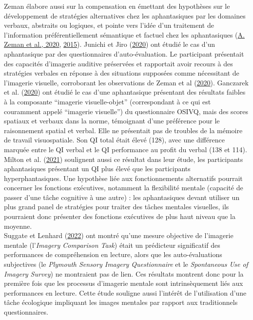 \documentclass[
  12pt,
]{article}
\begin{document}
Zeman élabore aussi sur la compensation en émettant des hypothèses sur
le développement de stratégies alternatives chez les aphantasiques par
les domaines verbaux, abstraits ou logiques, et pointe vers l'idée d'un
traitement de l'information préférentiellement sémantique et factuel
chez les aphantasiques
(\protect\hyperlink{ref-zemanPhantasiaPsychologicalSignificance2020}{A.
Zeman et al., 2020},
\protect\hyperlink{ref-zemanLivesImageryCongenital2015}{2015}). Junichi
et Jiro
(\protect\hyperlink{ref-junichiPreliminarySinglecaseStudy2020}{2020})
ont étudié le cas d'un aphantasique par des questionnaires
d'auto-évaluation. Le participant présentait des capacités d'imagerie
auditive préservées et rapportait avoir recours à des stratégies
verbales en réponse à des situations supposées comme nécessitant de
l'imagerie visuelle, corroborant les observations de Zeman et al
(\protect\hyperlink{ref-zemanPhantasiaPsychologicalSignificance2020}{2020}).
Ganczarek et al.
(\protect\hyperlink{ref-ganczarekRememberThingsCan2020}{2020}) ont
étudié le cas d'une aphantasique présentant des résultats faibles à la
composante ``imagerie visuelle-objet'' (correspondant à ce qui est
couramment appelé ``imagerie visuelle'') du questionnaire OSIVQ, mais
des scores spatiaux et verbaux dans la norme, témoignant d'une
préférence pour le raisonnement spatial et verbal. Elle ne présentait
pas de troubles de la mémoire de travail visuospatiale. Son QI total
était élevé (128), avec une différence marquée entre le QI verbal et le
QI performance au profit du verbal (138 et 114). Milton et al.
(\protect\hyperlink{ref-miltonBehavioralNeuralSignatures2021}{2021})
soulignent aussi ce résultat dans leur étude, les participants
aphantasiques présentant un QI plus élevé que les participants
hyperphantasiques. Une hypothèse liée aux fonctionnements alternatifs
pourrait concerner les fonctions exécutives, notamment la flexibilité
mentale (capacité de passer d'une tâche cognitive à une autre) : les
aphantasiques devant utiliser un plus grand panel de stratégies pour
traiter des tâches mentales visuelles, ils pourraient donc présenter des
fonctions exécutives de plus haut niveau que la moyenne.\\
Suggate et Lenhard
(\protect\hyperlink{ref-suggateMentalImagerySkill2022}{2022}) ont montré
qu'une mesure objective de l'imagerie mentale (l'\emph{Imagery
Comparison Task}) était un prédicteur significatif des performances de
compréhension en lecture, alors que les auto-évaluations subjectives (le
\emph{Plymouth Sensory Imagery Questionnaire} et le \emph{Spontaneous
Use of Imagery Survey}) ne montraient pas de lien. Ces résultats
montrent donc pour la première fois que les processus d'imagerie mentale
sont intrinsèquement liés aux performances en lecture. Cette étude
souligne aussi l'intérêt de l'utilisation d'une tâche écologique
impliquant les images mentales par rapport aux traditionnels
questionnaires.
\end{document}
